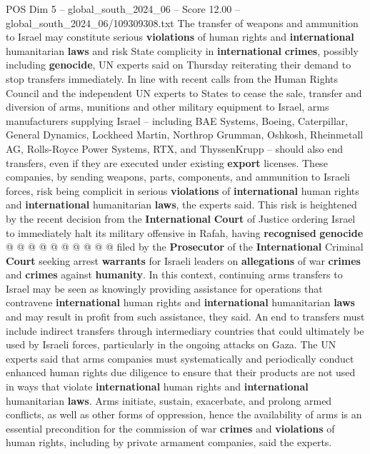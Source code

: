 \begin{textsample}{POS Dim 5 – global\_south\_2024\_06 – Score 12.00 – global\_south\_2024\_06/109309308.txt}  \label{ex:f5_pos_229}
The transfer of weapons and ammunition to Israel may constitute serious \textbf{violations} of human rights and \textbf{international} humanitarian \textbf{laws} and risk State complicity in \textbf{international} \textbf{crimes}, possibly including \textbf{genocide}, UN experts said on Thursday reiterating their demand to stop transfers immediately.
In line with recent calls from the Human Rights Council and the independent UN experts to States to cease the sale, transfer and diversion of arms, munitions and other military equipment to Israel, arms manufacturers supplying Israel -- including BAE Systems, Boeing, Caterpillar, General Dynamics, Lockheed Martin, Northrop Grumman, Oshkosh, Rheinmetall AG, Rolls-Royce Power Systems, RTX, and ThyssenKrupp -- should also end transfers, even if they are executed under existing \textbf{export} licenses.
These companies, by sending weapons, parts, components, and ammunition to Israeli forces, risk being complicit in serious \textbf{violations} of \textbf{international} human rights and \textbf{international} humanitarian \textbf{laws}, the experts said.
This risk is heightened by the recent decision from the \textbf{International} \textbf{Court} of Justice ordering Israel to immediately halt its military offensive in Rafah, having \textbf{recognised} \textbf{genocide} @ @ @ @ @ @ @ @ @ @ filed by the \textbf{Prosecutor} of the \textbf{International} Criminal \textbf{Court} seeking arrest \textbf{warrants} for Israeli leaders on \textbf{allegations} of war \textbf{crimes} and \textbf{crimes} against \textbf{humanity}.
In this context, continuing arms transfers to Israel may be seen as knowingly providing assistance for operations that contravene \textbf{international} human rights and \textbf{international} humanitarian \textbf{laws} and may result in profit from such assistance, they said.
An end to transfers must include indirect transfers through intermediary countries that could ultimately be used by Israeli forces, particularly in the ongoing attacks on Gaza.
The UN experts said that arms companies must systematically and periodically conduct enhanced human rights due diligence to ensure that their products are not used in ways that violate \textbf{international} human rights and \textbf{international} humanitarian \textbf{laws}.
Arms initiate, sustain, exacerbate, and prolong armed conflicts, as well as other forms of oppression, hence the availability of arms is an essential precondition for the commission of war \textbf{crimes} and \textbf{violations} of human rights, including by private armament companies, said the experts.

\end{textsample}
